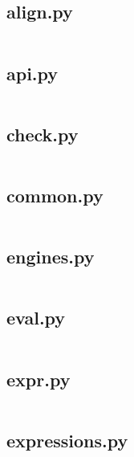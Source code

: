 \documentclass{article}
\begin{document}
\subsection{align.py}
\inputminted{python}{/home/dufferzafar/dev/@clones/pandas/pandas/core/computation/align.py}
\newpage

\subsection{api.py}
\inputminted{python}{/home/dufferzafar/dev/@clones/pandas/pandas/core/computation/api.py}
\newpage

\subsection{check.py}
\inputminted{python}{/home/dufferzafar/dev/@clones/pandas/pandas/core/computation/check.py}
\newpage

\subsection{common.py}
\inputminted{python}{/home/dufferzafar/dev/@clones/pandas/pandas/core/computation/common.py}
\newpage

\subsection{engines.py}
\inputminted{python}{/home/dufferzafar/dev/@clones/pandas/pandas/core/computation/engines.py}
\newpage

\subsection{eval.py}
\inputminted{python}{/home/dufferzafar/dev/@clones/pandas/pandas/core/computation/eval.py}
\newpage

\subsection{expr.py}
\inputminted{python}{/home/dufferzafar/dev/@clones/pandas/pandas/core/computation/expr.py}
\newpage

\subsection{expressions.py}
\inputminted{python}{/home/dufferzafar/dev/@clones/pandas/pandas/core/computation/expressions.py}
\newpage
\end{document}
